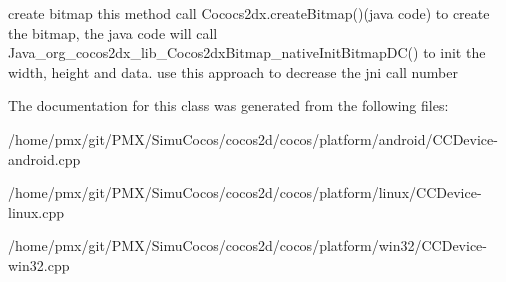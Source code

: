 create bitmap this method call Cococs2dx.\+create\+Bitmap()(java code) to create the bitmap, the java code will call Java\+\_\+org\+\_\+cocos2dx\+\_\+lib\+\_\+\+Cocos2dx\+Bitmap\+\_\+native\+Init\+Bitmap\+D\+C() to init the width, height and data. use this approach to decrease the jni call number

The documentation for this class was generated from the following files\+:\begin{DoxyCompactItemize}
\item 
/home/pmx/git/\+P\+M\+X/\+Simu\+Cocos/cocos2d/cocos/platform/android/C\+C\+Device-\/android.\+cpp\item 
/home/pmx/git/\+P\+M\+X/\+Simu\+Cocos/cocos2d/cocos/platform/linux/C\+C\+Device-\/linux.\+cpp\item 
/home/pmx/git/\+P\+M\+X/\+Simu\+Cocos/cocos2d/cocos/platform/win32/C\+C\+Device-\/win32.\+cpp\end{DoxyCompactItemize}
